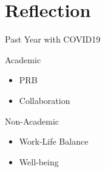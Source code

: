 \section{Reflection}
\begin{frame}{Past Year with COVID19}
  \begin{minipage}{0.45\textwidth}
    \begin{block}{\color{White} Academic}
      \begin{itemize}
        \item PRB 
        \item Collaboration
      \end{itemize}
    \end{block}
  \end{minipage}%
  \hspace{5mm}
  \begin{minipage}{0.45\textwidth}
    {
    \begin{block}{\color{White} Non-Academic}
      \begin{itemize}
        \item Work-Life Balance
        \item Well-being
      \end{itemize}
    \end{block}
  }
  \end{minipage}
\end{frame}

